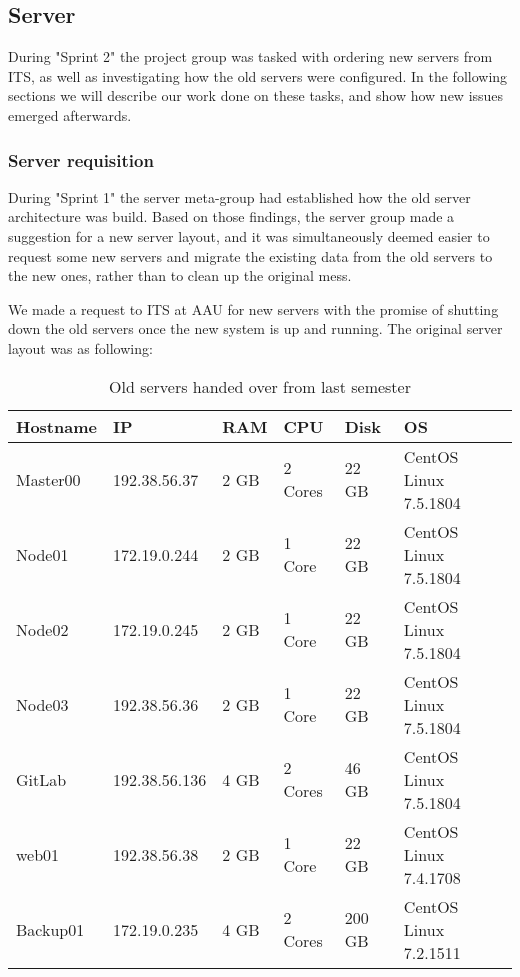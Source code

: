 \subsection{Server}\label{SEC:S2ServerWork}
During "Sprint 2" the project group was tasked with ordering new servers from ITS, as well as investigating how the old servers were configured. 
In the following sections we will describe our work done on these tasks, and show how new issues emerged afterwards. 

\subsubsection{Server requisition}
During "Sprint 1" the server meta-group had established how the old server architecture was build.
Based on those findings, the server group made a suggestion for a new server layout, and it was simultaneously deemed easier to request some new servers and migrate the existing data from the old servers to the new ones, rather than to clean up the original mess.

We made a request to ITS at AAU for new servers with the promise of shutting down the old servers once the new system is up and running. The original server layout was as following:

\begin{table}[H]

\begin{tabular}{|l|l|l|l|l|l|}
\hline
Hostname 	& IP 			& RAM 	& CPU 		& Disk 		& OS 						\\ \hline
Master00 	& 192.38.56.37 	& 2 GB 	& 2 Cores 	& 22 GB 	& CentOS Linux 7.5.1804 	\\ \hline
Node01 		& 172.19.0.244 	& 2 GB 	& 1 Core 	& 22 GB 	& CentOS Linux 7.5.1804 	\\ \hline
Node02		& 172.19.0.245	& 2 GB	& 1 Core	& 22 GB		& CentOS Linux 7.5.1804		\\ \hline
Node03		& 192.38.56.36	& 2 GB	& 1 Core 	& 22 GB		& CentOS Linux 7.5.1804 	\\ \hline
GitLab 		& 192.38.56.136	& 4 GB	& 2 Cores 	& 46 GB 	& CentOS Linux 7.5.1804 	\\ \hline
web01		& 192.38.56.38	& 2 GB	& 1 Core	& 22 GB 	& CentOS Linux 7.4.1708 	\\ \hline
Backup01	& 172.19.0.235	& 4 GB	& 2 Cores	& 200 GB 	& CentOS Linux 7.2.1511 	\\ \hline
\end{tabular}
\caption{Old servers handed over from last semester}
\end{table}

